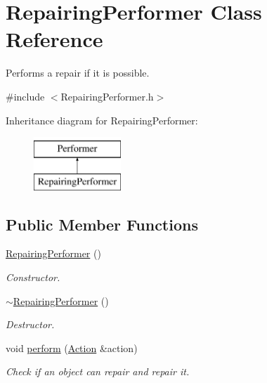 \hypertarget{classRepairingPerformer}{\section{Repairing\-Performer Class Reference}
\label{classRepairingPerformer}
}


Performs a repair if it is possible.  




{\ttfamily \#include $<$Repairing\-Performer.\-h$>$}

Inheritance diagram for Repairing\-Performer\-:\begin{figure}[H]
\begin{center}
\leavevmode
\includegraphics[height=2.000000cm]{classRepairingPerformer}
\end{center}
\end{figure}
\subsection*{Public Member Functions}
\begin{DoxyCompactItemize}
\item 
\hyperlink{classRepairingPerformer_a00372c85d083e2802071a7df02d8de9c}{Repairing\-Performer} ()
\begin{DoxyCompactList}\small\item\em Constructor. \end{DoxyCompactList}\item 
\hyperlink{classRepairingPerformer_ae0f76f761525ea03700cc62d1f895316}{$\sim$\-Repairing\-Performer} ()
\begin{DoxyCompactList}\small\item\em Destructor. \end{DoxyCompactList}\item 
void \hyperlink{classRepairingPerformer_ac987420b9ac52a7f189d562a0600f51b}{perform} (\hyperlink{classAction}{Action} \&action)
\begin{DoxyCompactList}\small\item\em Check if an object can repair and repair it. \end{DoxyCompactList}\end{DoxyCompactItemize}


